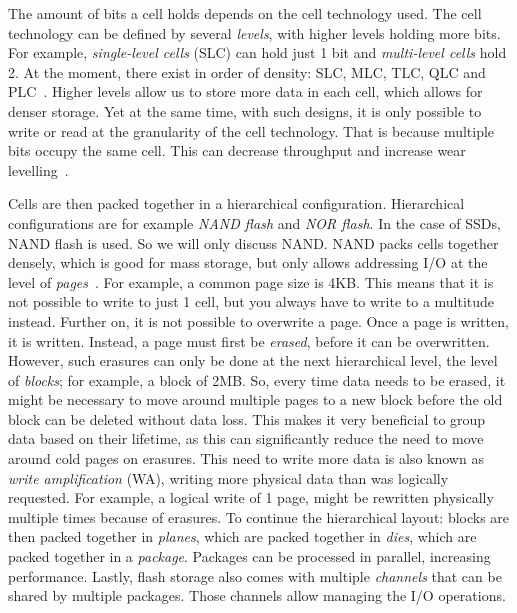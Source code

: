 The amount of bits a cell holds depends on the cell technology used. The cell technology can be defined by several \textit{levels}, with higher levels holding more bits. For example, \textit{single-level cells} (SLC) can hold just 1 bit and \textit{multi-level cells} hold 2. At the moment, there exist in order of density: SLC, MLC, TLC, QLC and PLC~\cite{ma2020low}. Higher levels allow us to store more data in each cell, which allows for denser storage. Yet at the same time, with such designs, it is only possible to write or read at the granularity of the cell technology. That is because multiple bits occupy the same cell. This can decrease throughput and increase wear levelling~\cite{alsalibi2018survey}. 

Cells are then packed together in a hierarchical configuration. Hierarchical configurations are for example \textit{NAND flash} and \textit{NOR flash}. In the case of SSDs, NAND flash is used. So we will only discuss NAND. NAND packs cells together densely, which is good for mass storage, but only allows addressing I/O at the level of \textit{pages}~\cite{cornwell2012anatomy}. For example, a common page size is 4KB. This means that it is not possible to write to just 1 cell, but you always have to write to a multitude instead. Further on, it is not possible to overwrite a page. Once a page is written, it is written. Instead, a page must first be \textit{erased}, before it can be overwritten. However, such erasures can only be done at the next hierarchical level, the level of \textit{blocks}; for example, a block of 2MB. So, every time data needs to be erased, it might be necessary to move around multiple pages to a new block before the old block can be deleted without data loss. This makes it very beneficial to group data based on their lifetime, as this can significantly reduce the need to move around cold pages on erasures. This need to write more data is also known as \textit{write amplification} (WA), writing more physical data than was logically requested. For example, a logical write of 1 page, might be rewritten physically multiple times because of erasures.  To continue the hierarchical layout: blocks are then packed together in \textit{planes}, which are packed together in \textit{dies}, which are packed together in a \textit{package}. Packages can be processed in parallel, increasing performance. Lastly, flash storage also comes with multiple \textit{channels} that can be shared by multiple packages. Those channels allow managing the I/O operations. 

